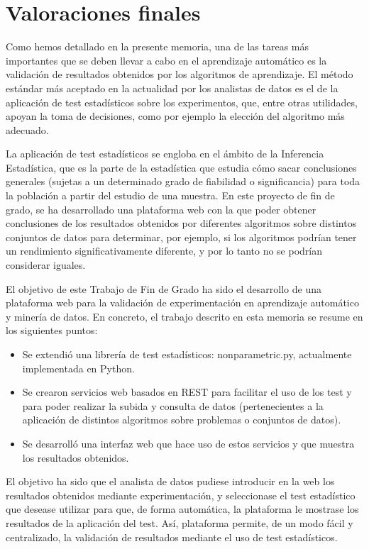 \chapter{Valoraciones finales}
Como hemos detallado en la presente memoria, una de las tareas más importantes que se deben llevar a cabo en el aprendizaje automático es la validación de resultados obtenidos por los algoritmos de aprendizaje. El método estándar más aceptado en la actualidad por los analistas de datos es el de la aplicación de test estadísticos sobre los experimentos, que, entre otras utilidades, apoyan la toma de decisiones, como por ejemplo la elección del algoritmo más adecuado.

La aplicación de test estadísticos se engloba en el ámbito de la Inferencia Estadística, que es la parte de la estadística que estudia cómo sacar conclusiones generales (sujetas a un determinado grado de fiabilidad o significancia) para toda la población a partir del estudio de una muestra. En este proyecto de fin de grado, se ha desarrollado una plataforma web con la que poder obtener conclusiones de los resultados obtenidos por diferentes algoritmos sobre distintos conjuntos de datos para determinar, por ejemplo, si los algoritmos podrían tener un rendimiento significativamente diferente, y por lo tanto no se podrían considerar iguales.

El objetivo de este Trabajo de Fin de Grado ha sido el desarrollo de una plataforma web para la validación de experimentación en aprendizaje automático y minería de datos. En concreto, el trabajo descrito en esta memoria se resume en los siguientes puntos:

\begin{itemize}
\item Se extendió una librería de test estadísticos: nonparametric.py, actualmente implementada en Python.
\item Se crearon servicios web basados en REST para facilitar el uso de los test y para poder realizar la subida y consulta de datos (pertenecientes a la aplicación de distintos algoritmos sobre problemas o conjuntos de datos).
\item Se desarrolló una interfaz web que hace uso de estos servicios y que muestra los resultados obtenidos.
\end{itemize}

El objetivo ha sido que el analista de datos pudiese introducir en la web los resultados obtenidos mediante experimentación, y seleccionase el test estadístico que desease utilizar para que, de forma automática, la plataforma le mostrase los resultados de la aplicación del test. Así, plataforma permite, de un modo fácil y centralizado, la validación de resultados mediante el uso de test estadísticos.

